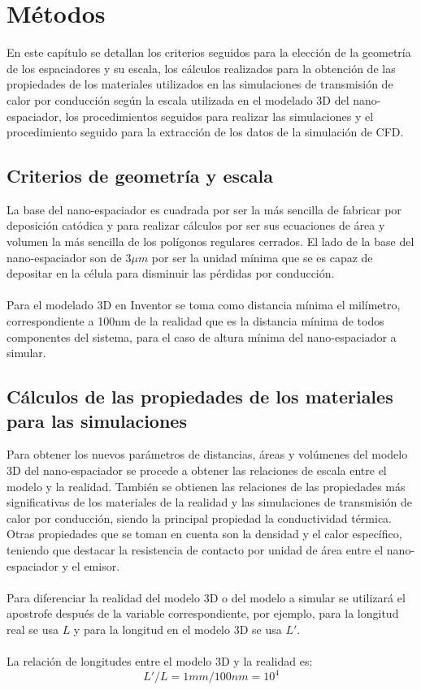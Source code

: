 \chapter{Métodos}
En este capítulo se detallan los criterios seguidos para la elección de la geometría de los espaciadores y su escala, los cálculos realizados para la obtención de las propiedades de los materiales utilizados en las simulaciones de transmisión de calor por conducción según la escala utilizada en el modelado 3D del nano-espaciador, los procedimientos seguidos para realizar las simulaciones y el procedimiento seguido para la extracción de los datos de la simulación de CFD.
\section{Criterios de geometría y escala} 
La base del nano-espaciador es cuadrada por ser la más sencilla de fabricar por deposición catódica y para realizar cálculos por ser sus ecuaciones de área y volumen la más sencilla de los polígonos regulares cerrados. El lado de la base del nano-espaciador son de 3$\mu m$ por ser la unidad mínima que se es capaz de depositar en la célula para disminuir las pérdidas por conducción.\\\\
Para el modelado 3D en Inventor se toma como distancia mínima el milímetro, correspondiente a 100nm de la realidad que es la distancia mínima de todos componentes del sistema, para el caso de altura mínima del nano-espaciador a simular.
\section{Cálculos de las propiedades de los materiales para las simulaciones}
Para obtener los nuevos parámetros de distancias, áreas y volúmenes del modelo 3D del nano-espaciador se procede a obtener las relaciones de escala entre el modelo y la realidad. También se obtienen las relaciones de las propiedades más significativas de los materiales de la realidad y las simulaciones de transmisión de calor por conducción, siendo la principal propiedad la conductividad térmica. Otras propiedades que se toman en cuenta son la densidad y el calor específico, teniendo que destacar la resistencia de contacto por unidad de área entre el nano-espaciador y el emisor.\\\\
Para diferenciar la realidad del modelo 3D o del modelo a simular se utilizará el apostrofe después de la variable correspondiente, por ejemplo, para la longitud real se usa $L$ y para la longitud en el modelo 3D se usa $L'$.\\\\
La relación de longitudes entre el modelo 3D y la realidad es:
\begin{equation}
{L'}/{L}={1mm}/{100nm}=10^4
\label{eq:relacion_longitud}
\end{equation}
